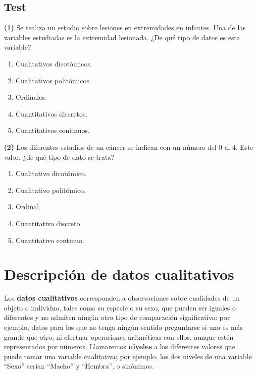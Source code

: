 \documentclass[
]{book}
\providecommand{\tightlist}{%
  \setlength{\itemsep}{0pt}\setlength{\parskip}{0pt}}
\theoremstyle{definition}
\theoremstyle{definition}
\theoremstyle{definition}
\theoremstyle{definition}
\theoremstyle{remark}
\begin{document}
\hypertarget{test-4}{%
\section{Test}\label{test-4}}

\textbf{(1)} Se realiza un estudio sobre lesiones en extremidades en infantes. Una de las variables estudiadas es la extremidad lesionada. ¿De qué tipo de datos es esta variable?

\begin{enumerate}
\def\labelenumi{\arabic{enumi}.}
\tightlist
\item
  Cualitativos dicotómicos.
\item
  Cualitativos politómicos.
\item
  Ordinales.
\item
  Cuantitativos discretos.
\item
  Cuantitativos continuos.
\end{enumerate}

\textbf{(2)} Los diferentes estadios de un cáncer se indican con un número del 0 al 4. Este valor, ¿de qué tipo de dato se trata?

\begin{enumerate}
\def\labelenumi{\arabic{enumi}.}
\tightlist
\item
  Cualitativo dicotómico.
\item
  Cualitativo politómico.
\item
  Ordinal.
\item
  Cuantitativo discreto.
\item
  Cuantitativo continuo.
\end{enumerate}

\hypertarget{descripciuxf3n-de-datos-cualitativos}{%
\chapter{Descripción de datos cualitativos}\label{descripciuxf3n-de-datos-cualitativos}}

Los \textbf{datos cualitativos} corresponden a observaciones sobre cualidades de un objeto o individuo, tales como su especie o su sexo, que pueden ser iguales o diferentes y no admiten ningún otro tipo de comparación significativa: por ejemplo, datos para los que no tenga ningún sentido preguntarse si uno es más grande que otro, ni efectuar operaciones aritméticas con ellos, aunque estén representados por números. Llamaremos \textbf{niveles} a los diferentes valores que puede tomar una variable cualitativa; por ejemplo, los dos niveles de una variable ``Sexo'' serían ``Macho'' y ``Hembra'', o sinónimos.
\end{document}
